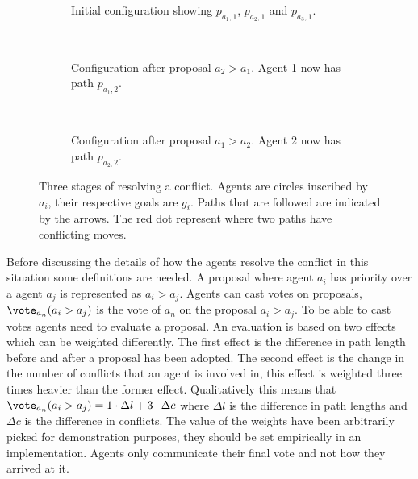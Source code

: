 \begin{figure}
    \centering
    \begin{subfigure}[t]{.3\textwidth}
        \centering
        \def\svgscale{.6}
        
        \caption{Initial configuration showing $p_{a_1,1}$, $p_{a_2,1}$ and 
            $p_{a_3,1}$.}
        \label{fig:example-initial}
    \end{subfigure}
    ~
    \begin{subfigure}[t]{.3\textwidth}
        \centering
        \def\svgscale{.6}
        
        \caption{Configuration after proposal $a_2 > a_1$. Agent 1 now has path 
            $p_{a_1,2}$.}
        \label{fig:example-prop1}
    \end{subfigure}
    ~
    \begin{subfigure}[t]{.3\textwidth}
        \centering
        \def\svgscale{.6}
        
        \caption{Configuration after proposal $a_1 > a_2$. Agent 2 now has path 
            $p_{a_2,2}$.}
        \label{fig:example-solution}
    \end{subfigure}
    \caption{Three stages of resolving a conflict. Agents are circles inscribed
        by $a_i$, their respective goals are $g_i$. Paths that are followed are
        indicated by the arrows. The red dot represent where two paths have
        conflicting moves.}
    \label{fig:example}
\end{figure}

Before discussing the details of how the agents resolve the conflict in this
situation some definitions are needed. A proposal where agent $a_i$ has
priority over a agent $a_j$ is represented as $a_i > a_j$. Agents can cast
votes on proposals, $\vote_{a_n}(a_i > a_j)$ is the vote of $a_n$ on the
proposal $a_i > a_j$. To be able to cast votes agents need to evaluate a
proposal. An evaluation  is based on two effects which can be weighted
differently. The first effect is the difference in path length before and after
a proposal has been adopted. The second effect is the change in the number of
conflicts that an agent is involved in, this effect is weighted three times
heavier than the former effect. Qualitatively this means that $\vote_{a_n}(a_i
> a_j) = 1 \cdot \Delta l + 3 \cdot \Delta c$ where $\Delta l$ is the
difference in path lengths and $\Delta c$ is the difference in conflicts. The 
value of the weights have been arbitrarily picked for demonstration purposes, 
they should be set empirically in an implementation.
Agents only communicate their final vote and not how they arrived at it.

